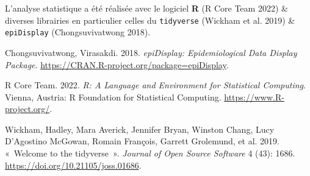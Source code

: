 \documentclass[
  10pt,
  a4paper,
]{scrartcl}
\newlength{\cslhangindent}
\newlength{\cslentryspacingunit} %
\newenvironment{CSLReferences}[2] %
 {%
  \setlength{\parindent}{0pt}
  \ifodd #1
  \let\oldpar\par
  \def\par{\hangindent=\cslhangindent\oldpar}
  \fi
  \setlength{\parskip}{#2\cslentryspacingunit}
 }%
 {}
\begin{document}
L'analyse statistique a été réalisée avec le logiciel \textbf{R} (R Core
Team 2022) \& diverses librairies en particulier celles du
\texttt{tidyverse} (Wickham et al. 2019) \& \texttt{epiDisplay}
(Chongsuvivatwong 2018).

\hypertarget{refs}{}
\begin{CSLReferences}{1}{0}
\leavevmode{}%
Chongsuvivatwong, Virasakdi. 2018. \emph{epiDisplay: Epidemiological
Data Display Package}.
\url{https://CRAN.R-project.org/package=epiDisplay}.

\leavevmode{}%
R Core Team. 2022. \emph{R: A Language and Environment for Statistical
Computing}. Vienna, Austria: R Foundation for Statistical Computing.
\url{https://www.R-project.org/}.

\leavevmode{}%
Wickham, Hadley, Mara Averick, Jennifer Bryan, Winston Chang, Lucy
D'Agostino McGowan, Romain François, Garrett Grolemund, et al. 2019.
{«~Welcome to the {tidyverse}~»}. \emph{Journal of Open Source Software}
4 (43): 1686. \url{https://doi.org/10.21105/joss.01686}.

\end{CSLReferences}
\end{document}
